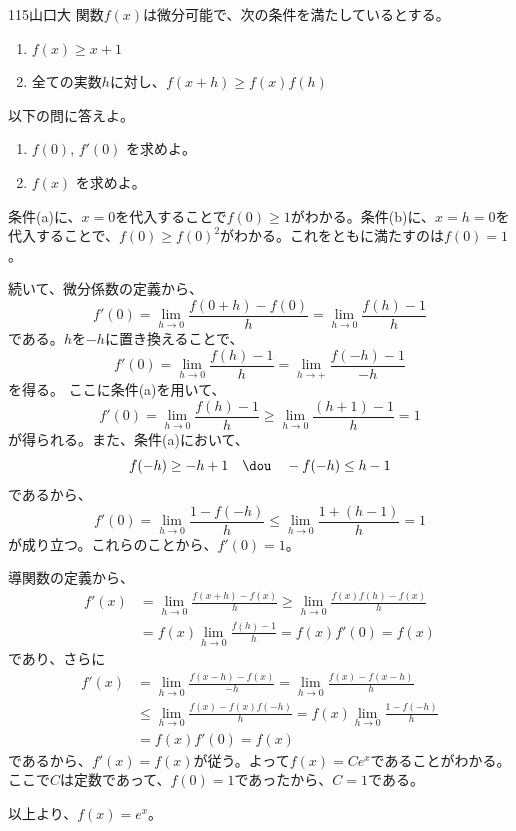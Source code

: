 \begin{prob}{115}{}{山口大}
 関数$f(x)$は微分可能で、次の条件を満たしているとする。
 \begin{enumerate}
  \renewcommand{\labelenumi}{(\alph{enumi})}
  \item $f(x)\ge x+1$
  \item 全ての実数$h$に対し、$f(x+h)\ge f(x)f(h)$
 \end{enumerate}
 以下の問に答えよ。
 \begin{enumerate}
  \item $f(0)$, $f'(0)$ を求めよ。
  \item $f(x)$ を求めよ。
 \end{enumerate}
\end{prob}
条件(a)に、$x=0$を代入することで$f(0)\ge 1$がわかる。条件(b)に、$x=h=0$を代入することで、$f(0)\ge f(0)^2$がわかる。これをともに満たすのは$f(0)=1$。

続いて、微分係数の定義から、
\[ f'(0) = \lim_{h\to 0} \frac{f(0+h)-f(0)}{h} = \lim_{h\to 0}\frac{f(h)-1}{h} \]
である。$h$を$-h$に置き換えることで、
\[ f'(0) = \lim_{h\to 0} \frac{f(h)-1}{h} = \lim_{h\to +} \frac{f(-h)-1}{-h} \]
を得る。
ここに条件(a)を用いて、
\[ f'(0) = \lim_{h\to 0}\frac{f(h)-1}{h} \ge \lim_{h\to 0}\frac{(h+1)-1}{h} = 1 \]
が得られる。また、条件(a)において、
\[ f(-h)\ge -h+1 \quad\dou\quad -f(-h)\le h-1 \]
であるから、
\[ f'(0) = \lim_{h\to 0} \frac{1-f(-h)}{h} \le \lim_{h\to 0} \frac{1+(h-1)}{h} = 1 \]
が成り立つ。これらのことから、$f'(0) = 1$。

導関数の定義から、
\begin{align*}
 f'(x) &= \lim_{h\to 0} \frac{f(x+h)-f(x)}{h}\ge \lim_{h\to 0} \frac{f(x)f(h)-f(x)}{h} \\
 &= f(x) \lim_{h\to 0} \frac{f(h)-1}{h} = f(x)f'(0) = f(x)
\end{align*}
であり、さらに
\begin{align*}
 f'(x) &= \lim_{h\to 0} \frac{f(x-h)-f(x)}{-h}=\lim_{h\to 0}\frac{f(x)-f(x-h)}{h} \\
 &\le \lim_{h\to 0} \frac{f(x)-f(x)f(-h)}{h} = f(x)\lim_{h\to 0}\frac{1-f(-h)}{h} \\
 &= f(x)f'(0)=f(x)
\end{align*}
であるから、$f'(x)=f(x)$が従う。よって$f(x)=Ce^x$であることがわかる。ここで$C$は定数であって、$f(0)=1$であったから、$C=1$である。

以上より、$f(x)=e^x$。

